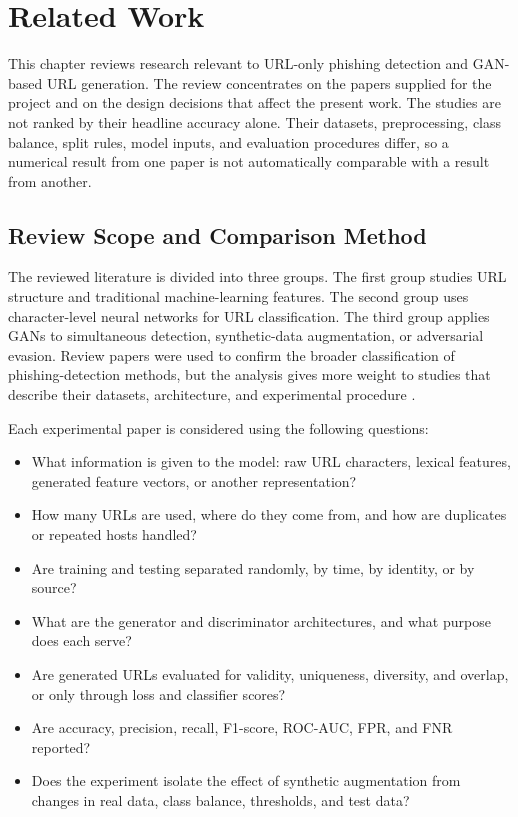 \chapter{Related Work}
\label{chapter:related-work}

This chapter reviews research relevant to URL-only phishing detection and
GAN-based URL generation. The review concentrates on the papers supplied for
the project and on the design decisions that affect the present work. The
studies are not ranked by their headline accuracy alone. Their datasets,
preprocessing, class balance, split rules, model inputs, and evaluation
procedures differ, so a numerical result from one paper is not automatically
comparable with a result from another.

\section{Review Scope and Comparison Method}

The reviewed literature is divided into three groups. The first group studies
URL structure and traditional machine-learning features. The second group uses
character-level neural networks for URL classification. The third group applies
GANs to simultaneous detection, synthetic-data augmentation, or adversarial
evasion. Review papers were used to confirm the broader classification of
phishing-detection methods, but the analysis gives more weight to studies that
describe their datasets, architecture, and experimental procedure
\citep{qasim2023review}.

Each experimental paper is considered using the following questions:

\begin{itemize}
\item What information is given to the model: raw URL characters, lexical
features, generated feature vectors, or another representation?
\item How many URLs are used, where do they come from, and how are duplicates
or repeated hosts handled?
\item Are training and testing separated randomly, by time, by identity, or by
source?
\item What are the generator and discriminator architectures, and what purpose
does each serve?
\item Are generated URLs evaluated for validity, uniqueness, diversity, and
overlap, or only through loss and classifier scores?
\item Are accuracy, precision, recall, F1-score, ROC-AUC, FPR, and FNR reported?
\item Does the experiment isolate the effect of synthetic augmentation from
changes in real data, class balance, thresholds, and test data?
\end{itemize}

